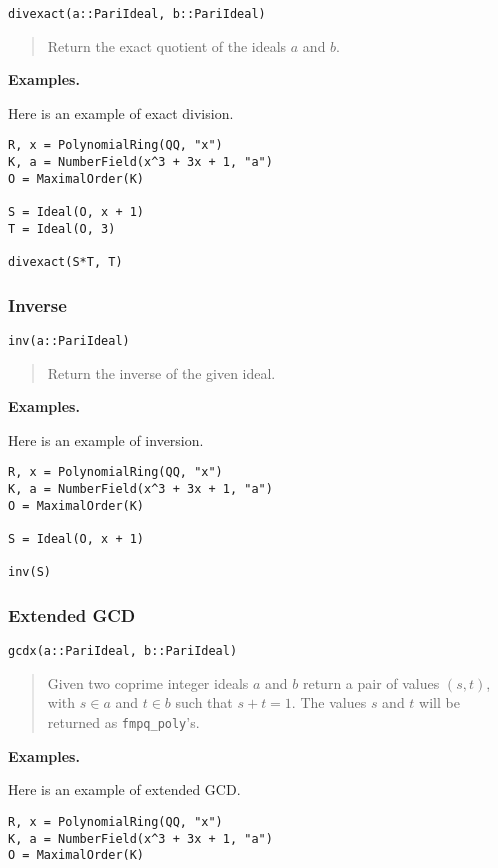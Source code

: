 \documentclass[a4paper,10pt]{article}
\newcommand{\code}{\lstinline}
\newcommand{\desc}[1]{\vspace{-3mm}\begin{quote}#1\end{quote}}
\begin{document}
{{\begin{lstlisting}
divexact(a::PariIdeal, b::PariIdeal)
\end{lstlisting}

\desc{Return the exact quotient of the ideals $a$ and $b$.}

\textbf{Examples.}

Here is an example of exact division.

\begin{lstlisting}
R, x = PolynomialRing(QQ, "x")
K, a = NumberField(x^3 + 3x + 1, "a")
O = MaximalOrder(K)

S = Ideal(O, x + 1)
T = Ideal(O, 3)

divexact(S*T, T)
\end{lstlisting}

\subsubsection{Inverse}

\begin{lstlisting}
inv(a::PariIdeal)
\end{lstlisting}

\desc{Return the inverse of the given ideal.}

\textbf{Examples.}

Here is an example of inversion.

\begin{lstlisting}
R, x = PolynomialRing(QQ, "x")
K, a = NumberField(x^3 + 3x + 1, "a")
O = MaximalOrder(K)

S = Ideal(O, x + 1)

inv(S)
\end{lstlisting}

\subsubsection{Extended GCD}

\begin{lstlisting}
gcdx(a::PariIdeal, b::PariIdeal)
\end{lstlisting}

\desc{Given two coprime integer ideals $a$ and $b$ return a pair of values $(s, t)$,
with $s \in a$ and $t \in b$ such that $s + t = 1$. The values $s$ and $t$ will be
returned as \code{fmpq_poly}'s.}

\textbf{Examples.}

Here is an example of extended GCD.

\begin{lstlisting}
R, x = PolynomialRing(QQ, "x")
K, a = NumberField(x^3 + 3x + 1, "a")
O = MaximalOrder(K)


\end{lstlisting}}}
\end{document}

